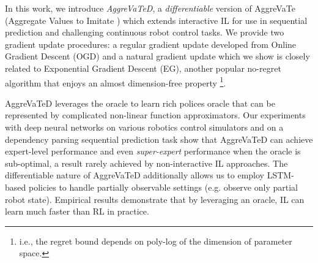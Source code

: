 \documentclass{article}
\newcommand{\arun}[1]{\textcolor{red}{\bf Arun: {#1}}}
\begin{document}

In this work, we introduce \emph{AggreVaTeD}, a \emph{differentiable} version of AggreVaTe (Aggregate Values to Imitate \cite{ross2014reinforcement}) which extends interactive IL for use in sequential prediction and challenging continuous robot control tasks.  We provide two gradient update procedures: a regular gradient update developed from Online Gradient Descent (OGD) \cite{Zinkevich2003_ICML} and a natural gradient update  \cite{kakade2002natural,bagnell2003covariant} which we show is closely related to Exponential Gradient Descent (EG), another popular no-regret algorithm that enjoys an almost dimension-free property \cite{bubeck2015convex}\footnote{i.e., the regret bound depends on poly-log of the dimension of parameter space.}. %

AggreVaTeD leverages the oracle to learn rich polices oracle that can be represented by complicated non-linear function approximators. Our experiments with deep neural networks on various robotics control simulators and on a dependency parsing sequential prediction task show that AggreVaTeD can achieve expert-level performance and even \emph{super-expert} performance when the oracle is sub-optimal, a result rarely achieved by non-interactive IL approaches. The differentiable nature of AggreVaTeD additionally allows us to employ LSTM-based policies to handle partially observable settings (e.g. observe only partial robot state). Empirical results demonstrate that by leveraging an oracle, IL can learn much faster than RL in practice.
\end{document}
